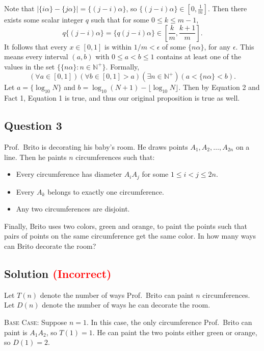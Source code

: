 \documentclass{article}
\begin{document}
    \vspace{1.5mm}
    Note that $|\{i\alpha\} - \{j\alpha\}| = \{(j - i) \alpha\}$, so $\{(j - i) \alpha\} \in \left[0, \frac{1}{m}\right]$. Then there exists some scalar integer $q$ such that for some $0 \le k \le m - 1$, $$q\{(j - i) \alpha\} = \{q(j - i) \alpha\} \in \left[\frac{k}{m}, \frac{k + 1}{m}\right].$$ It follows that every $x \in [0, 1]$ is within $1/m < \epsilon$ of some $\{n\alpha\}$, for any $\epsilon$. This means every interval $(a, b)$ with $0 \le a < b \le 1$ contains at least one of the values in the set  $\{\{n\alpha\} : n \in \mathbb{N}^{+}\}$. Formally, 
    \begin{equation}
        (\forall a \in [0, 1])(\forall b \in [0, 1] > a)(\exists n \in \mathbb{N}^{+})(a < \{n\alpha\} < b).
    \end{equation}
    Let $a = \{\log_{10}N\}$ and $b = \log_{10}(N + 1) - \lfloor \log_{10}N \rfloor$. Then by Equation 2 and Fact 1, Equation 1 is true, and thus our original proposition is true as well.

\subsection*{Question 3}
    Prof.\ Brito is decorating his baby's room. He draws points $A_{1}, A_{2}, \dots, A_{2n}$ on a line. Then he paints $n$ circumferences such that: 
    \begin{itemize}[parsep = 1pt, topsep = 5pt]
        \item Every circumference has diameter $A_{i}A_{j}$ for some $1 \le i < j \le 2n$.
        \item Every $A_{k}$ belongs to exactly one circumference.
        \item Any two circumferences are disjoint.
    \end{itemize}
    Finally, Brito uses two colors, green and orange, to paint the points such that pairs of points on the same circumference get the same color. In how many ways can Brito decorate the room?

\subsection*{Solution \textcolor{red}{(Incorrect)}}
    Let $T(n)$ denote the number of ways Prof.\ Brito can paint $n$ circumferences. Let $D(n)$ denote the number of ways he can decorate the room.
    
    \vspace{1.5mm}
    \textsc{Base Case}: Suppose $n = 1$. In this case, the only circumference Prof.\ Brito can paint is $A_{1}A_{2}$, so $T(1) = 1$. He can paint the two points either green or orange, so $D(1) = 2$. 
    
\end{document}
